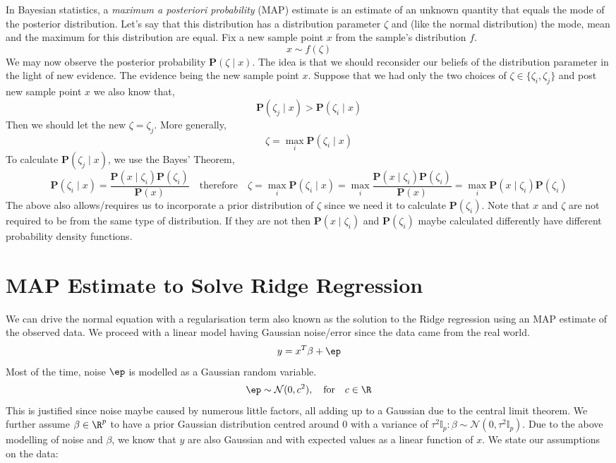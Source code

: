 \documentclass{homework}
\renewcommand\P{\mathbf{P}}
\begin{document}
In Bayesian statistics, a \textit{maximum a posteriori probability}
(MAP) estimate is an estimate of an unknown quantity that equals the
mode of the posterior distribution. Let's say that this distribution
has a distribution parameter $\zeta$ and (like the normal
distribution) the mode, mean and the maximum for this distribution are
equal. Fix a new sample point $x$ from the sample's distribution $f$.
\[
  x \sim f(\zeta)
\]
We may now observe the posterior probability $\P(\zeta \mid x)$. The
idea is that we should reconsider our beliefs of the distribution
parameter in the light of new evidence. The evidence being the new
sample point $x$. Suppose that we had only the two choices of
$\zeta \in \{\zeta_i, \zeta_j\}$ and post new sample point $x$ we also
know that,
\[
  \P(\zeta_j \mid x) >  \P(\zeta_i \mid x)
\]
Then we should let the new $\zeta = \zeta_j$. More generally,
\[
  \zeta = \max_i \P(\zeta_i \mid x)
\]
To calculate $\P(\zeta_j \mid x)$, we use the Bayes' Theorem,
\[
  \P(\zeta_i \mid x) = \frac{\P(x \mid \zeta_i)\P(\zeta_i)}{\P(x)}
  \quad \text{therefore} \quad
  \zeta = \max_i \P(\zeta_i \mid x)
  = \max_i \frac{\P(x \mid \zeta_i)\P(\zeta_i)}{\P(x)}
  = \max_i \P(x \mid \zeta_i)\P(\zeta_i)
\]
The above also allows/requires us to incorporate a prior distribution
of $\zeta$ since we need it to calculate $\P(\zeta_i)$. Note that $x$
and $\zeta$ are not required to be from the same type of distribution.
If they are not then $\P(x \mid \zeta_i)$ and $\P(\zeta_i)$ maybe
calculated differently \eg have different probability density
functions.

\section{MAP Estimate to Solve Ridge Regression}
We can drive the normal equation with a regularisation term also known
as the solution to the Ridge regression using an MAP estimate of the
observed data. We proceed with a linear model having Gaussian
noise/error since the data came from the real world.
\[
  y = x^T\beta+\ep
\]
Most of the time, noise $\ep$ is modelled as a Gaussian random variable.
\[
  \ep\sim\mathcal{N}(0, c^2), \quad \text{for} \quad c \in \R
\]
This is justified since noise maybe caused by numerous little factors,
all adding up to a Gaussian due to the central limit theorem. We
further assume $\beta\in\R^p$ to have a prior Gaussian distribution
centred around 0 with a variance of
$\tau^2\mathbb{I}_p: \beta \sim \mathcal{N}(0,
\tau^2\mathbb{I}_p)$. Due to the above modelling of noise and $\beta$,
we know that $y$ are also Gaussian and with expected values as a
linear function of $x$. We state our assumptions on the data:
\end{document}

